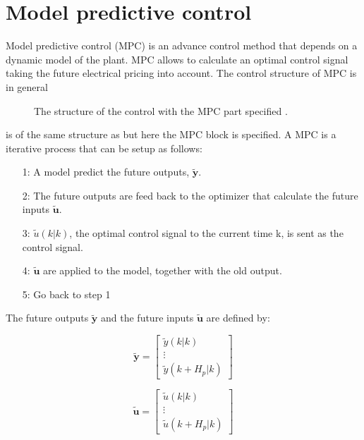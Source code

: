 \section{Model predictive control}
\label{sec:MPC}

Model predictive control (MPC) is an advance control method that depends on a dynamic model of the plant. MPC allows to calculate an optimal control signal taking the future electrical pricing into account. The control structure of MPC is in general 

\begin{figure}[H]
\centering
 
\caption{The structure of the control with the MPC part specified \cite{Camacho2007}.}
\label{mpc_structure}
\end{figure}

 is of the same structure as  but here the MPC block is specified. A MPC is a iterative process that can be setup as follows: 

\begin{itemize}
\item[1:] A model predict the future outputs, $\pmb{\tilde y}$.
\item[2:] The future outputs are feed back to the optimizer that calculate the future inputs $\pmb{\tilde u}$.
\item[3:] $\tilde u(k|k)$, the optimal control signal to the current time k, is sent as the control signal.
\item[4:] $\pmb{\tilde u}$ are applied to the model, together with the old output.
\item[5:] Go back to step 1 
\end{itemize}

The future outputs $\pmb{\tilde y}$ and the future inputs $\pmb{\tilde u}$ are defined by:

\begin{equation}
\pmb{\tilde y} =  
 \begin{bmatrix}
  \tilde y(k|k)\\
  \vdots  \\
  \tilde y(k+H_p|k)   
 \end{bmatrix}
\end{equation}

\begin{equation}
\pmb{\tilde u} =  
 \begin{bmatrix}
  \tilde u(k|k)\\
  \vdots  \\
  \tilde u(k+H_p|k)   
 \end{bmatrix}
\end{equation}

